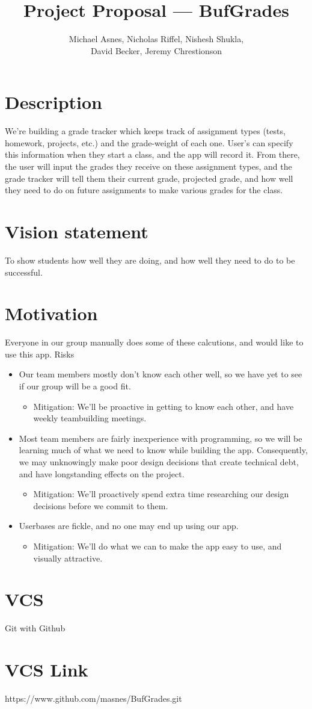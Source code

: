 \documentclass{article}
\begin{document}
\title{Project Proposal --- BufGrades}
\author{Michael Asnes, Nicholas Riffel, Nishesh Shukla, \\ David Becker, Jeremy Chrestionson}

\maketitle
\section{Description}
We're building a grade tracker which keeps track of assignment types (tests, homework, projects, etc.) and the grade-weight of each one. User's can specify this information when they start a class, and the app will record it. From there, the user will input the grades they receive on these assignment types, and the grade tracker will tell them their current grade, projected grade, and how well they need to do on future assignments to make various grades for the class.
\section{Vision statement}
To show students how well they are doing, and how well they need to do to be successful.
\section{Motivation} 
Everyone in our group manually does some of these calcutions, and would like to use this app.
{Risks}
\begin{itemize}
  \item Our team members mostly don't know each other well, so we have yet to see if our group will be a good fit.
    \begin{itemize}
      \item Mitigation: We'll be proactive in getting to know each other, and have weekly teambuilding meetings.
    \end{itemize}
  \item Most team members are fairly inexperience with programming, so we will be learning much of what we need to know while building the app. Consequently, we may unknowingly make poor design decisions that create technical debt, and have longstanding effects on the project.
    \begin{itemize}
      \item Mitigation: We'll proactively spend extra time researching our design decisions before we commit to them.
    \end{itemize}
  \item Userbases are fickle, and no one may end up using our app.
    \begin{itemize}
      \item Mitigation: We'll do what we can to make the app easy to use, and visually attractive.
    \end{itemize}
\end{itemize}
\section{VCS}
Git with Github
\section{VCS Link}
https://www.github.com/masnes/BufGrades.git
\end{document}
